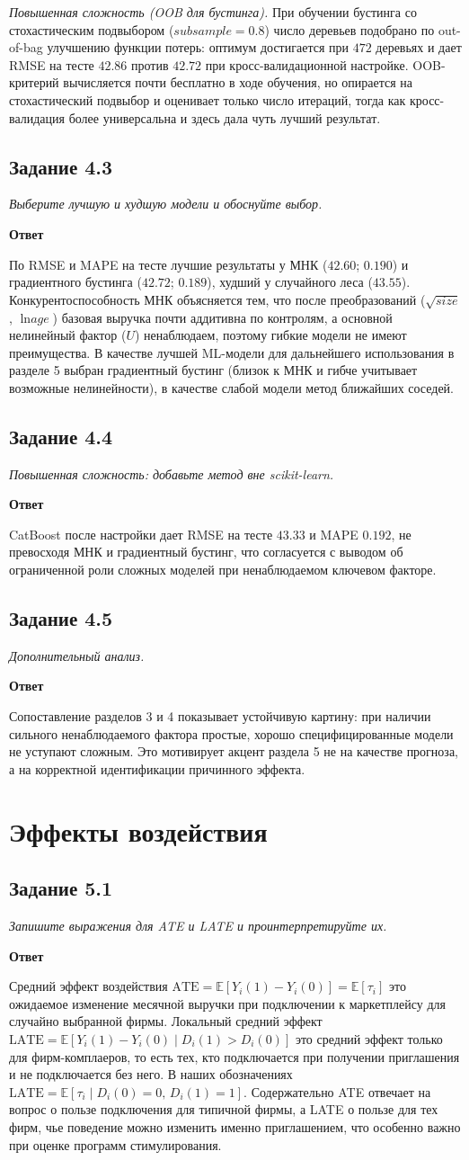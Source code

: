 \documentclass[12pt,a4paper]{article}
\newcommand{\zadanie}[2]{\subsection*{Задание #1}\begingroup\itshape #2\par\endgroup\medskip}
\newcommand{\otvet}{\par\noindent\textbf{Ответ}\par\medskip}
\begin{document}
\textit{Повышенная сложность (OOB для бустинга).} При обучении бустинга со стохастическим подвыбором ($\textit{subsample}=0.8$) число деревьев подобрано по out-of-bag улучшению функции потерь: оптимум достигается при $472$ деревьях и дает RMSE на тесте $42.86$ против $42.72$ при кросс-валидационной настройке. OOB-критерий вычисляется почти бесплатно в ходе обучения, но опирается на стохастический подвыбор и оценивает только число итераций, тогда как кросс-валидация более универсальна и здесь дала чуть лучший результат.

\zadanie{4.3}{Выберите лучшую и худшую модели и обоснуйте выбор.}
\otvet
По RMSE и MAPE на тесте лучшие результаты у МНК ($42.60$; $0.190$) и градиентного бустинга ($42.72$; $0.189$), худший у случайного леса ($43.55$). Конкурентоспособность МНК объясняется тем, что после преобразований ($\sqrt{\textit{size}}$, $\ln\textit{age}$) базовая выручка почти аддитивна по контролям, а основной нелинейный фактор ($U$) ненаблюдаем, поэтому гибкие модели не имеют преимущества. В качестве лучшей ML-модели для дальнейшего использования в разделе 5 выбран градиентный бустинг (близок к МНК и гибче учитывает возможные нелинейности), в качестве слабой модели метод ближайших соседей.

\zadanie{4.4}{Повышенная сложность: добавьте метод вне scikit-learn.}
\otvet
CatBoost после настройки дает RMSE на тесте $43.33$ и MAPE $0.192$, не превосходя МНК и градиентный бустинг, что согласуется с выводом об ограниченной роли сложных моделей при ненаблюдаемом ключевом факторе.

\zadanie{4.5}{Дополнительный анализ.}
\otvet
Сопоставление разделов 3 и 4 показывает устойчивую картину: при наличии сильного ненаблюдаемого фактора простые, хорошо специфицированные модели не уступают сложным. Это мотивирует акцент раздела 5 не на качестве прогноза, а на корректной идентификации причинного эффекта.

\section{Эффекты воздействия}

\zadanie{5.1}{Запишите выражения для ATE и LATE и проинтерпретируйте их.}
\otvet
Средний эффект воздействия $\mathrm{ATE}=\mathbb{E}[Y_i(1)-Y_i(0)]=\mathbb{E}[\tau_i]$ это ожидаемое изменение месячной выручки при подключении к маркетплейсу для случайно выбранной фирмы. Локальный средний эффект $\mathrm{LATE}=\mathbb{E}[Y_i(1)-Y_i(0)\mid D_i(1)>D_i(0)]$ это средний эффект только для фирм-комплаеров, то есть тех, кто подключается при получении приглашения и не подключается без него. В наших обозначениях $\mathrm{LATE}=\mathbb{E}[\tau_i\mid D_i(0)=0,\,D_i(1)=1]$. Содержательно ATE отвечает на вопрос о пользе подключения для типичной фирмы, а LATE о пользе для тех фирм, чье поведение можно изменить именно приглашением, что особенно важно при оценке программ стимулирования.
\end{document}
